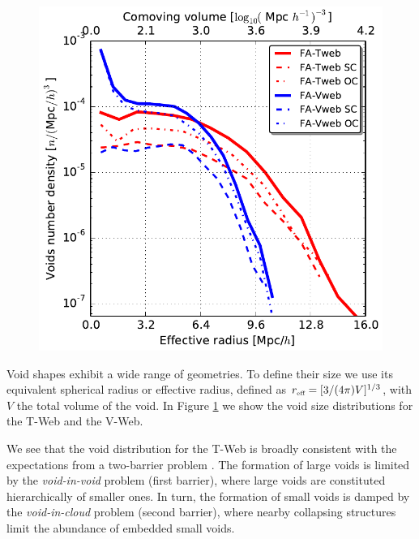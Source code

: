 \documentclass[a4,useAMS,usenatbib,usegraphicx]{mn2e}
\newcommand{\reff}{{\ifmmode{r_{\mbox{\tiny eff}}}\else{$r_{\mbox{\tiny eff}}$}\fi}}
\begin{document}
\begin{figure}
\centering

  \includegraphics[trim = 0mm 0mm 0mm 0mm, clip, keepaspectratio=true,
  width=0.3\textheight]{voids_regions_volume_all.pdf}


  \label{fig:volume_function}

\end{figure}


Void shapes exhibit a wide range of geometries.
To define their size we use its equivalent spherical radius or
effective radius, defined as $\reff = [3/(4\pi)V]^{1/3}$, with $V$ the 
total volume of the void. 
In Figure \ref{fig:volume_function} we show the void size
distributions for the T-Web and the V-Web.

We see that the void distribution for the T-Web is broadly consistent with the
expectations from a two-barrier problem  \citep{Sheth04}. 
The formation of large voids is limited by the \textit{void-in-void}
problem (first barrier), where large voids are constituted
hierarchically of smaller ones. 
In turn, the formation of small  voids is damped by the
\textit{void-in-cloud} problem (second barrier),  where nearby
collapsing structures limit the abundance of embedded small  voids.  
\end{document}
